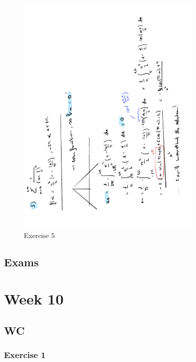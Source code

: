 \documentclass[a4paper]{report}
\begin{document}
\begin{figure}[H]
	\centering
	\includegraphics[angle=-90, width=0.8\textwidth]{assets/bord_9_ex_5.pdf}
	\caption{Exercise 5}
	\label{fig:bord_9_ex_5}
\end{figure}

\subsection{Exams}



\section{Week 10}

\subsection{WC}

\subsubsection{Exercise 1}


\end{document}
